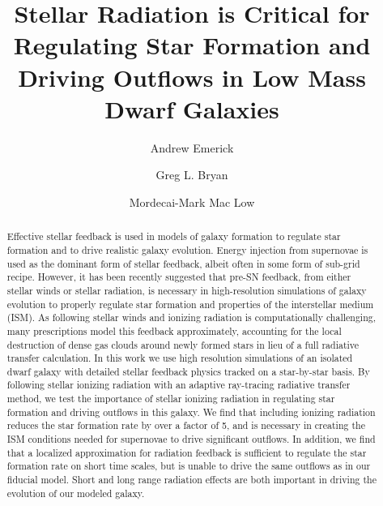 \documentclass[twocolumn]{aastex62}
\begin{document}
\title{Stellar Radiation is Critical for Regulating Star Formation and Driving Outflows in Low Mass Dwarf Galaxies}


\author{Andrew Emerick}

\author{Greg L. Bryan}

\author{Mordecai-Mark Mac Low}

\nocollaboration



\begin{abstract}
%
%
%
%
Effective stellar feedback is used in models of galaxy formation to regulate star formation and to drive realistic galaxy evolution. Energy injection from supernovae is used as the dominant form of stellar feedback, albeit often in some form of sub-grid recipe. However, it has been recently suggested that pre-SN feedback, from either stellar winds or stellar radiation, is necessary in high-resolution simulations of galaxy evolution to properly regulate star formation and properties of the interstellar medium (ISM). As following stellar winds and ionizing radiation is computationally challenging, many prescriptions model this feedback approximately, accounting for the local destruction of dense gas clouds around newly formed stars in lieu of a full radiative transfer calculation. In this work we use high resolution simulations of an isolated dwarf galaxy with detailed stellar feedback physics tracked on a star-by-star basis. By following stellar ionizing radiation with an adaptive ray-tracing radiative transfer method, we test the importance of stellar ionizing radiation in regulating star formation and driving outflows in this galaxy. We find that including ionizing radiation reduces the star formation rate by over a factor of 5, and is necessary in creating the ISM conditions needed for supernovae to drive significant outflows. In addition, we find that a localized approximation for radiation feedback is sufficient to regulate the star formation rate on short time scales, but is unable to drive the same outflows as in our fiducial model. Short and long range radiation effects are both important in driving the evolution of our modeled galaxy.
\end{abstract}
\end{document}
